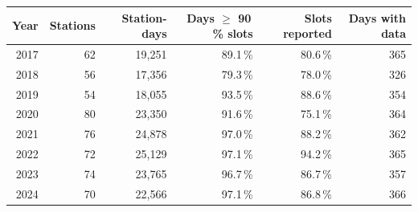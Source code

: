 \begin{tabular}{rrrrrr}
\toprule
Year & Stations & Station-days & Days $\geq$ 90\,\% slots & Slots reported & Days with data \\
\midrule
2017 & 62 & 19{,}251 & 89.1\,\% & 80.6\,\% & 365 \\
2018 & 56 & 17{,}356 & 79.3\,\% & 78.0\,\% & 326 \\
2019 & 54 & 18{,}055 & 93.5\,\% & 88.6\,\% & 354 \\
2020 & 80 & 23{,}350 & 91.6\,\% & 75.1\,\% & 364 \\
2021 & 76 & 24{,}878 & 97.0\,\% & 88.2\,\% & 362 \\
2022 & 72 & 25{,}129 & 97.1\,\% & 94.2\,\% & 365 \\
2023 & 74 & 23{,}765 & 96.7\,\% & 86.7\,\% & 357 \\
2024 & 70 & 22{,}566 & 97.1\,\% & 86.8\,\% & 366 \\
\bottomrule
\end{tabular}
